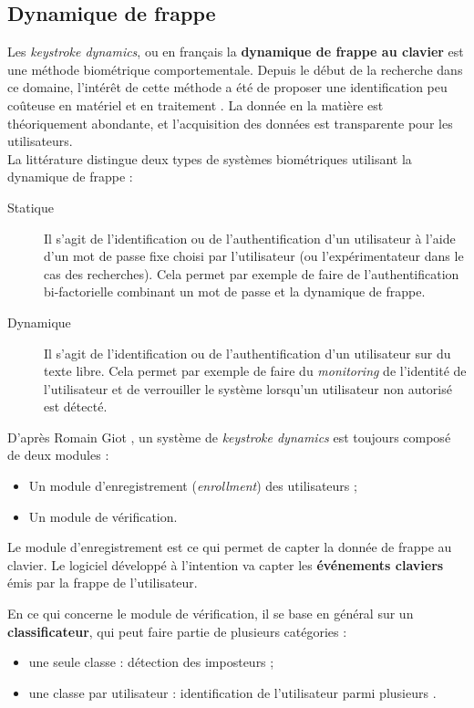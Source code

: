 \subsection{Dynamique de frappe}
\label{subsec:ddf}

Les \textit{keystroke dynamics}, ou en français la \textbf{dynamique de frappe au clavier} est une méthode biométrique comportementale. Depuis le début de la recherche dans ce domaine\cite{rand}, l'intérêt de cette méthode a été de proposer une identification peu coûteuse en matériel et en traitement \cite{monrose1997}. La donnée en la matière est théoriquement abondante, et l'acquisition des données est transparente pour les utilisateurs.\\

La littérature distingue deux types de systèmes biométriques utilisant la dynamique de frappe :\\


\begin{description}
  \item[Statique] Il s'agit de l'identification ou de l'authentification d'un utilisateur à l'aide d'un mot de passe fixe choisi par l'utilisateur (ou l'expérimentateur dans le cas des recherches). Cela permet par exemple de faire de l'authentification bi-factorielle combinant un mot de passe et la dynamique de frappe.
  \item[Dynamique] Il s'agit de l'identification ou de l'authentification d'un utilisateur sur du texte libre. Cela permet par exemple de faire du \textit{monitoring} de l'identité de l'utilisateur et de verrouiller le système lorsqu'un utilisateur non autorisé est détecté.\\
\end{description}

D'après Romain Giot \cite{giotBenchmark}, un système de \textit{keystroke dynamics} est toujours composé de deux modules :\\

\begin{itemize}
	\item Un module d'enregistrement (\textit{enrollment}) des utilisateurs ;
	\item Un module de vérification.\\
\end{itemize}

Le module d'enregistrement est ce qui permet de capter la donnée de frappe au clavier. Le logiciel développé à l'intention va capter les \textbf{événements claviers} émis par la frappe de l'utilisateur.

En ce qui concerne le module de vérification, il se base en général sur un \textbf{classificateur}, qui peut faire partie de plusieurs catégories : 

\begin{itemize}
	\item une seule classe : détection des imposteurs ;
	\item une classe par utilisateur : identification de l'utilisateur parmi plusieurs .
\end{itemize}



